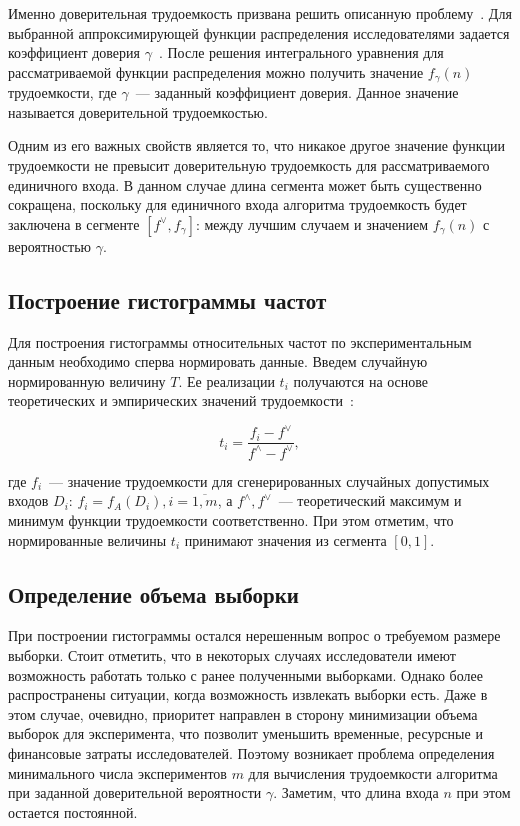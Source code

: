 \documentclass[a4paper, article, 12pt]{extarticle}
\begin{document}
Именно доверительная трудоемкость призвана решить описанную проблему~\cite{petrushyn_ulyanov_analysis}. Для выбранной аппроксимирующей функции распределения исследователями задается коэффициент доверия $\gamma$~\cite{koroluk}. После решения интегрального уравнения для рассматриваемой функции распределения можно получить значение $f_\gamma(n)$ трудоемкости, где $\gamma$~--- заданный коэффициент доверия. Данное значение называется доверительной трудоемкостью.

Одним из его важных свойств является то, что никакое другое значение функции трудоемкости не превысит доверительную трудоемкость для рассматриваемого единичного входа. В данном случае длина сегмента может быть существенно сокращена, поскольку для единичного входа алгоритма трудоемкость будет заключена в сегменте $[f^\vee, f_\gamma]$: между лучшим случаем и значением $f_\gamma(n)$ с вероятностью $\gamma$.

\subsection{Построение гистограммы частот}\label{sec:frequency_histogram}

Для построения гистограммы относительных частот по экспериментальным данным необходимо сперва нормировать данные. Введем случайную нормированную величину $T$. Ее реализации $t_i$ получаются на основе теоретических и эмпирических значений трудоемкости~\cite{petrushyn_ulyanov_analysis}:

\begin{equation}\label{eq:t_value}
	t_i = \frac{f_i - f^\vee}{f^\wedge - f^\vee},
\end{equation}

\noindent где $f_i$~--- значение трудоемкости для сгенерированных случайных допустимых входов $D_i$: $f_i = f_A(D_i), i = \overline{1, m}$, а $f^\wedge, f^\vee$~--- теоретический максимум и минимум функции трудоемкости соответственно. При этом отметим, что нормированные величины $t_i$ принимают значения из сегмента $[0, 1]$.

\subsection{Определение объема выборки}\label{sec:selection_size}

При построении гистограммы остался нерешенным вопрос о требуемом размере выборки. Стоит отметить, что в некоторых случаях исследователи имеют возможность работать только с ранее полученными выборками. Однако более распространены ситуации, когда возможность извлекать выборки есть. Даже в этом случае, очевидно, приоритет направлен в сторону минимизации объема выборок для эксперимента, что позволит уменьшить временные, ресурсные и финансовые затраты исследователей. Поэтому возникает проблема определения минимального числа экспериментов $m$ для вычисления трудоемкости алгоритма при заданной доверительной вероятности $\gamma$. Заметим, что длина входа $n$ при этом остается постоянной.
\end{document}
